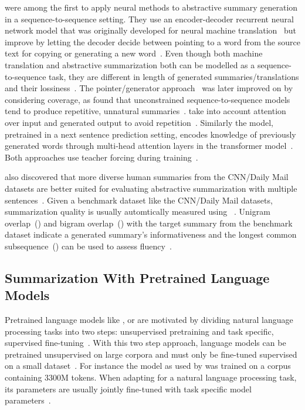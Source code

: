 \citeauthor{NallapatiZSGX2016} were among the first to apply neural methods to abstractive summary generation in a sequence-to-sequence setting. They use an encoder-decoder recurrent neural network model that was originally developed for neural machine translation~\cite{https://arxiv.org/abs/1409.0473} but improve by letting the decoder decide between pointing to a word from the source text for copying or generating a new word~\cite{NallapatiZSGX2016}.
Even though both machine translation and abstractive summarization both can be modelled as a sequence-to-sequence task, they are different in length of generated summaries/translations and their lossiness~\cite{NallapatiZSGX2016}.
The pointer/generator approach~\cite{NallapatiZSGX2016} was later improved on by considering coverage, as \citeauthor{SeeLM2017} found that unconstrained sequence-to-sequence models tend to produce repetitive, unnatural summaries~\cite{SeeLM2017,PaulusXS2018}.
\citeauthor{PaulusXS2018} take into account attention over input and generated output to avoid repetition~\cite{PaulusXS2018}.
Similarly the \Bert model, pretrained in a next sentence prediction setting, encodes knowledge of previously generated words through multi-head attention layers in the transformer model~\cite{DevlinCLT2019}.
Both approaches use teacher forcing during training~\cite{PaulusXS2018,DevlinCLT2019}.

\citeauthor{NallapatiZSGX2016} also discovered that more diverse human summaries from the CNN/Daily Mail datasets are better suited for evaluating abstractive summarization with multiple sentences~\cite{NallapatiZSGX2016,HermannKGEKSB2015}.
Given a benchmark dataset like the CNN/Daily Mail datasets, summarization quality is usually automtically measured using \Rouge~\cite{Lin2004}.
Unigram overlap~() and bigram overlap~() with the target summary from the benchmark dataset indicate a generated summary's informativeness and the longest common subsequence~(\RougeL) can be used to assess fluency~\cite{LiuL2019}.

\subsection{Summarization With Pretrained Language Models}

Pretrained language models like \Elmo, \Gpt or \Bert are motivated by dividing natural language processing tasks into two steps: unsupervised pretraining and task specific, supervised fine-tuning~\cite{PetersNIGCLZ2018,RadfordNSS2018,DevlinCLT2019}.
With this two step approach, language models can be pretrained unsupervised on large corpora and must only be fine-tuned supervised on a small dataset~\cite{DevlinCLT2019}.
For instance the \BertBase model as used by \citeauthor{LiuL2019} was trained on a corpus containing 3300M tokens.
When adapting \Bert for a natural language processing task, its parameters are usually jointly fine-tuned with task specific model parameters~\cite{DevlinCLT2019,LiuL2019}.

